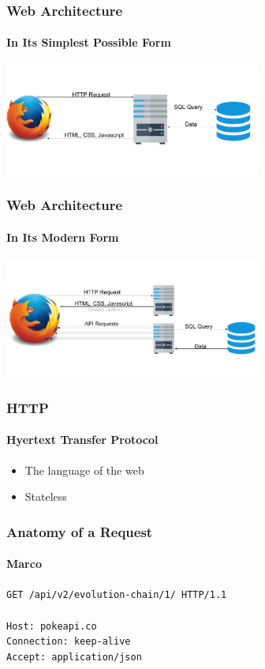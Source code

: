 \documentclass{beamer}
\begin{document}
\begin{frame}
  \frametitle{Web Architecture}
  \framesubtitle{In Its Simplest Possible Form}
  \includegraphics[width=320]{img/web-architecture-1.png}
\end{frame}


\begin{frame}
  \frametitle{Web Architecture}
  \framesubtitle{In Its Modern Form}
  \includegraphics[width=320]{img/web-architecture-2.png}
\end{frame}


\begin{frame}
  \frametitle{HTTP}
  \framesubtitle{Hyertext Transfer Protocol}
  \begin{itemize}
    \item The language of the web
    \item Stateless
  \end{itemize}
\end{frame}


\begin{frame}
  \frametitle{Anatomy of a Request}
  \framesubtitle{Marco}
  \texttt{{\color{red}GET} {\color{darkgreen}/api/v2/evolution-chain/1/} {\color{blue}HTTP/1.1}}
  \pause
  \\
  \bigskip
  \\
  {
    \color{olive}
    \texttt{Host: pokeapi.co} \\
    \texttt{Connection: keep-alive} \\
    \texttt{Accept: application/json}
  }
\end{frame}
\end{document}
